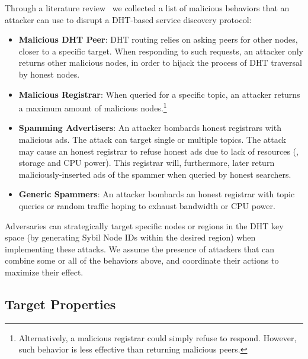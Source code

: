 Through a literature review~\cite{chen2020survey, henningsen2019eclipsing} we collected a list of malicious behaviors that an attacker can use to disrupt a DHT-based service discovery protocol:
\begin{itemize}
    \item \textbf{Malicious DHT Peer}: DHT routing relies on asking peers for other nodes, closer to a specific target. When responding to such requests, an attacker only returns other malicious nodes, in order to hijack the process of DHT traversal by honest nodes.  
    \item \textbf{Malicious Registrar}: When queried for a specific topic, an attacker returns a maximum amount of malicious nodes.\footnote{Alternatively, a malicious registrar could simply refuse to respond. However, such behavior is less effective than returning malicious peers.}
    \item \textbf{Spamming Advertisers}: An attacker bombards honest registrars with malicious ads. The attack can target single or multiple topics. The attack may cause an honest registrar to refuse honest ads due to lack of resources (\eg, storage and CPU power). This registrar will, furthermore, later return maliciously-inserted ads of the spammer when queried by honest searchers. 
    \item \textbf{Generic Spammers}: An attacker bombards an honest registrar with topic queries or random traffic hoping to exhaust bandwidth or CPU power.
\end{itemize}

Adversaries can strategically target specific nodes or regions in the DHT key space (\ie by generating Sybil Node IDs within the desired region) when implementing these attacks.
We assume the presence of attackers that can combine some or all of the behaviors above, and coordinate their actions to maximize their effect. 

\subsection{Target Properties}

